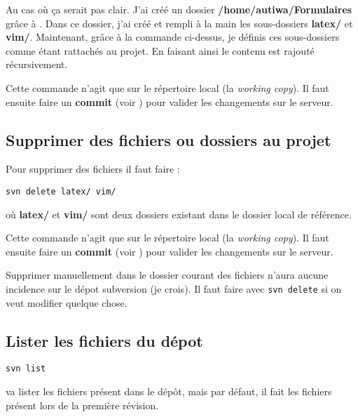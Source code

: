 \documentclass[a4paper,twoside]{article}
\begin{document}
\begin{remarque}
Au cas où ça serait pas clair. J'ai créé un dossier \textbf{/home/autiwa/Formulaires} grâce à . Dans ce dossier, j'ai créé et rempli à la main les sous-dossiers \textbf{latex/} et \textbf{vim/}. Maintenant, grâce à la commande ci-dessus, je définis ces sous-dossiers comme étant rattachés au projet. En faisant ainsi le contenu est rajouté récursivement.
\end{remarque}

\begin{attention}
Cette commande n'agit que sur le répertoire local (la \emph{working copy}). Il faut ensuite faire un \textbf{commit} (voir ) pour valider les changements sur le serveur.
\end{attention}

\subsection{Supprimer des fichiers ou dossiers au projet}
Pour supprimer des fichiers il faut faire :
\begin{verbatim}
svn delete latex/ vim/ 
\end{verbatim}
où \textbf{latex/} et \textbf{vim/} sont deux dossiers existant dans le dossier local de référence. 

\begin{attention}
Cette commande n'agit que sur le répertoire local (la \emph{working copy}). Il faut ensuite faire un \textbf{commit} (voir ) pour valider les changements sur le serveur.
\end{attention}

\begin{remarque}
Supprimer manuellement dans le dossier courant des fichiers n'aura aucune incidence sur le dépot subversion (je crois). Il faut faire avec \texttt{svn delete} si on veut modifier quelque chose.
\end{remarque}

\subsection{Lister les fichiers du dépot}
\begin{verbatim}
svn list
\end{verbatim}
va lister les fichiers présent dans le dépôt, mais par défaut, il fait les fichiers présent lors de la première révision. 
\end{document}
